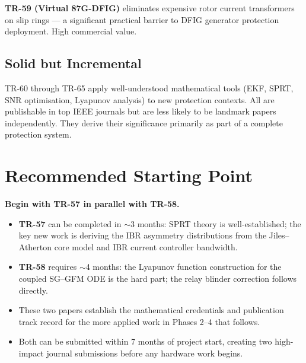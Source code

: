 \documentclass[12pt, a4paper]{report}
\begin{document}
\textbf{TR-59 (Virtual 87G-DFIG)} eliminates expensive rotor current transformers on slip rings — a significant practical barrier to DFIG generator protection deployment. High commercial value.

\subsection{Solid but Incremental}

TR-60 through TR-65 apply well-understood mathematical tools (EKF, SPRT, SNR optimisation, Lyapunov analysis) to new protection contexts. All are publishable in top IEEE journals but are less likely to be landmark papers independently. They derive their significance primarily as part of a complete protection system.

\section{Recommended Starting Point}

\begin{tcolorbox}[notebox]
\textbf{Begin with TR-57 in parallel with TR-58.}

\begin{itemize}[nosep]
  \item \textbf{TR-57} can be completed in $\sim$3 months: SPRT theory is well-established; the key new work is deriving the IBR asymmetry distributions from the Jiles--Atherton core model and IBR current controller bandwidth.
  \item \textbf{TR-58} requires $\sim$4 months: the Lyapunov function construction for the coupled SG--GFM ODE is the hard part; the relay blinder correction follows directly.
  \item These two papers establish the mathematical credentials and publication track record for the more applied work in Phases 2--4 that follows.
  \item Both can be submitted within 7 months of project start, creating two high-impact journal submissions before any hardware work begins.
\end{itemize}
\end{tcolorbox}

\bigskip
\begin{center}
\end{center}
\end{document}
